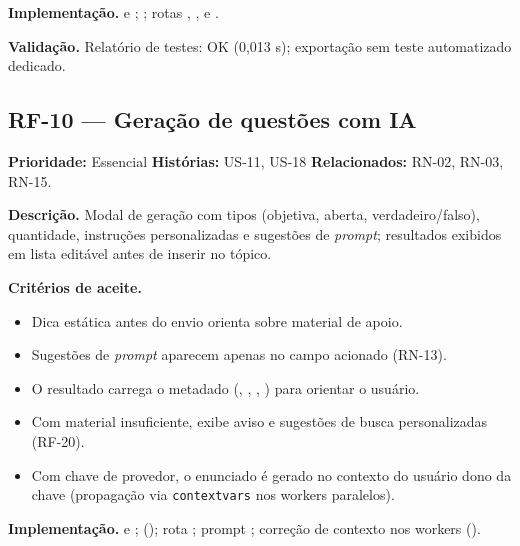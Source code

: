 \textbf{Implementação.}  e ; ; rotas \texttt{}, \texttt{}, \texttt{} e \texttt{}.

\textbf{Validação.} Relatório de testes: \texttt{} OK (0,013 s); exportação sem teste automatizado dedicado.

\subsection{RF-10 --- Geração de questões com IA}

\textbf{Prioridade:} Essencial \quad \textbf{Histórias:} US-11, US-18 \quad \textbf{Relacionados:} RN-02, RN-03, RN-15.

\textbf{Descrição.} Modal de geração com tipos (objetiva, aberta, verdadeiro/falso), quantidade, instruções personalizadas e sugestões de \emph{prompt}; resultados exibidos em lista editável antes de inserir no tópico.

\textbf{Critérios de aceite.}
\begin{itemize}
    \item Dica estática antes do envio orienta sobre material de apoio.
    \item Sugestões de \emph{prompt} aparecem apenas no campo acionado (RN-13).
    \item O resultado carrega o metadado \texttt{} (\texttt{}, \texttt{}, \texttt{}, \texttt{}) para orientar o usuário.
    \item Com material insuficiente, exibe aviso e sugestões de busca personalizadas (RF-20).
    \item Com chave de provedor, o enunciado é gerado no contexto do usuário dono da chave (propagação via \texttt{contextvars} nos workers paralelos).
\end{itemize}

\textbf{Implementação.}  e ;  (\texttt{}); rota \texttt{}; prompt ; correção de contexto nos workers ().

